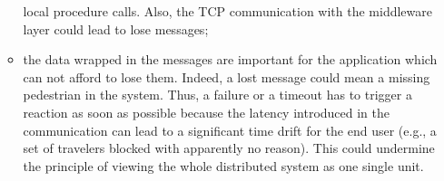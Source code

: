 \begin{itemize}
\begin{itemize}
  	local procedure
  	calls. Also, the TCP communication with the middleware layer could lead to
  	lose messages;
  	\item the data wrapped in the messages are important for the
  	application which can not afford to lose them. Indeed, a lost message
    could mean a missing pedestrian in the system. Thus, a failure
  	or a timeout has to trigger a reaction as soon as possible because
  	the latency introduced in the communication can lead to a significant
  	time drift for the end user (e.g., a set of travelers blocked with
  	apparently no reason). This could undermine the principle of viewing the
  	whole distributed system as one single unit.
  \end{itemize}
\end{itemize}
